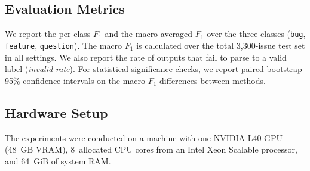 \subsection{Evaluation Metrics}
\label{sec:setup-metrics}
We report the per-class $F_1$ and the macro-averaged $F_1$ over the three classes (\texttt{bug}, \texttt{feature}, \texttt{question}). The macro $F_1$ is calculated over the total 3{,}300-issue test set in all settings. We also report the rate of outputs that fail to parse to a valid label (\textit{invalid rate}). For statistical significance checks, we report paired bootstrap 95\% confidence intervals on the macro $F_1$ differences between methods.

\subsection{Hardware Setup}
\label{sec:setup-hardware}
The experiments were conducted on a machine with one NVIDIA L40 GPU (48~GB VRAM), 8~allocated CPU cores from an Intel Xeon Scalable processor, and 64~GiB of system RAM.
